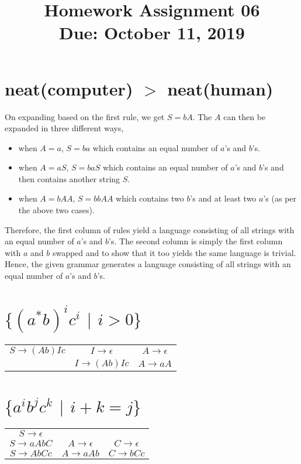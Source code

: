 \documentclass[11pt,letterpaper]{article}
\title{Homework Assignment 06 \\
    \small Due: October 11, 2019}
\begin{document}
\maketitle

\section{neat(computer) $>$ neat(human)}
On expanding based on the first rule, we get $S = bA$. The $A$ can then be expanded in three different ways,
\begin{itemize}
    \item when $A = a$, $S = ba$ which contains an equal number of $a$'s and $b$'s.
    \item when $A = aS$, $S = baS$ which contains an equal number of $a$'s and $b$'s and then contains another string $S$.
    \item when $A = bAA$, $S = bbAA$ which contains two $b$'s and at least two $a$'s (as per the above two cases).
\end{itemize}
Therefore, the first column of rules yield a language consisting of all strings with an equal number of $a$'s and $b$'s. The second column is simply the first column with $a$ and $b$ swapped and to show that it too yields the same language is trivial. \\
Hence, the given grammar generates a language consisting of all strings with an equal number of $a$'s and $b$'s.
\pagebreak

\section{$\{(a^*b)^i c^i$ $|$ $i>0\}$}
\begin{table}[!h]
    \centering
    \begin{tabular}{c c c}
    $S \rightarrow (Ab)Ic$ & 
    $I \rightarrow \epsilon$ &
    $A \rightarrow \epsilon$ \\
    
    &
    $I \rightarrow (Ab)Ic$ &
    $A \rightarrow aA$
    \end{tabular}
    \label{tab:2}
\end{table}

\section{$\{a^i b^j c^k$ $|$ $i+k=j\}$}
\begin{table}[!h]
\centering
\begin{tabular}{c c c}
$S \rightarrow \epsilon$ & 
&
\\

$S \rightarrow aAbC$ &
$A \rightarrow \epsilon$ & 
$C \rightarrow \epsilon$ \\

$S \rightarrow AbCc$ &
$A \rightarrow aAb$ &
$C \rightarrow bCc$
\end{tabular}
\label{tab:03}
\end{table}
\end{document}
